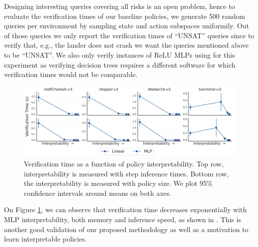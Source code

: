 Designing interesting queries covering all risks is an open problem, hence to evaluate the verification times of our baseline policies, we generate 500 random queries per environment by sampling state and action subspaces uniformily.
Out of those queries we only report the verification times of ``UNSAT'' queries since to verify that, e.g., the lander does not crash we want the queries mentioned above to be ``UNSAT''.
We also only verify instances of ReLU MLPs using \cite{maraboupy} for this experiment as verifying decision trees requires a different software \cite{z3} for which verification times would not be comparable.

\begin{figure}[ht]
    \centering
    \includegraphics[width=1\linewidth]{images/images_part3/verification_tradeoff.pdf}
    \caption{Verification time as a function of policy interpretability. Top row, interpretability is measured with step inference times. Bottom row, the interpretability is measured with policy size. We plot 95\% confidence intervals around means on both axes.}
    \label{fig:trade-off-verif}
\end{figure}

On Figure \ref{fig:trade-off-verif}, we can observe that verification time decreases exponentially with MLP interpretability, both memory and inference speed, as shown in \cite{lens-complexity}.
This is another good validation of our proposed methodology as well as a motivation to learn interpretable policies. 

